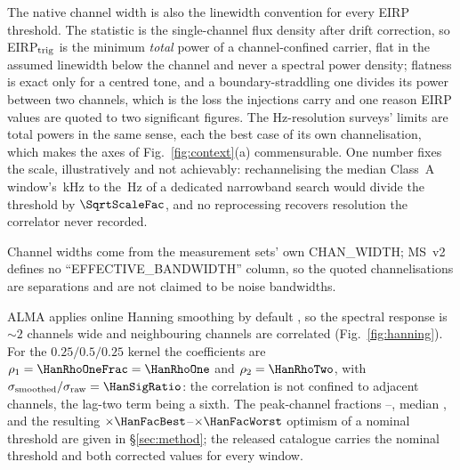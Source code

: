 The native channel width is also the linewidth convention for every EIRP
threshold. The statistic is the single-channel flux density after drift
correction, so EIRP$_{\rm trig}$ is the minimum \emph{total} power of a
channel-confined carrier, flat in the assumed linewidth below the channel and
never a spectral power density; flatness is exact only for a centred tone,
and a boundary-straddling one divides its power between two channels, which
is the loss the injections carry and one reason EIRP values are quoted to two
significant figures. The Hz-resolution
surveys' limits are total powers in the same sense, each the best case of
its own channelisation, which makes the axes of Fig.~\ref{fig:context}(a)
commensurable. One number fixes the scale, illustratively and not
achievably: rechannelising the median Class~A window's
\SqrtScaleChanKHz\,kHz to the \SETIChanHz\,Hz of a dedicated narrowband
search would divide the threshold by $\SqrtScaleFac$, and no reprocessing
recovers resolution the correlator never recorded.

Channel widths come from the measurement sets' own CHAN\_WIDTH; MS~v2
defines no ``EFFECTIVE\_BANDWIDTH'' column, so the quoted channelisations are
separations and are not claimed to be noise bandwidths.

ALMA applies online Hanning smoothing by default \citep{ALMAHandbook}, so
the spectral response is ${\sim}2$ channels wide and neighbouring channels are correlated
(Fig.~\ref{fig:hanning}). For the $0.25/0.5/0.25$ kernel the coefficients
are $\rho_1=\HanRhoOneFrac=\HanRhoOne$ and $\rho_2=\HanRhoTwo$, with
$\sigma_{\rm smoothed}/\sigma_{\rm raw}=\HanSigRatio$: the correlation is
not confined to adjacent channels, the lag-two term being a sixth. The
peak-channel fractions \HanWorst--\HanBest, median \HanMed, and the
resulting $\times\HanFacBest$--$\times\HanFacWorst$ optimism of a nominal
threshold are given in \S\ref{sec:method}; the released catalogue carries the
nominal threshold and both corrected values for every window.

